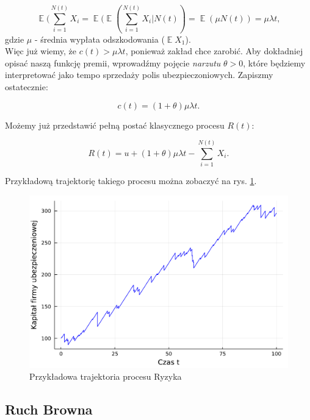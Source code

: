 \documentclass{article}
\theoremstyle{break}
\DeclareMathOperator{\EX}{\mathbb{E}}
\numberwithin{equation}{subsection}
\numberwithin{figure}{section}
\begin{document}
\begin{equation}
\EX(\sum_{i=1}^{N(t)}X_i = \EX(\EX(\sum_{i=1}^{N(t)}X_i | N(t)) = \EX(\mu N(t)) = \mu \lambda t,
\end{equation}
gdzie $\mu$ - średnia wypłata odszkodowania ($\EX X_1$).\\
Więc już wiemy, że $c(t) >  \mu \lambda t$, ponieważ zakład chce zarobić. Aby dokładniej opisać naszą funkcję premii, wprowadźmy pojęcie \emph{narzutu} $\theta >0$, które będziemy interpretować jako tempo sprzedaży polis ubezpieczoniowych. Zapiszmy ostatecznie:

\begin{equation}
c(t) = (1+\theta)\mu \lambda t. \label{eq:c}
\end{equation}

Możemy już przedstawić pełną postać klasycznego procesu $R(t)$:

\begin{equation}
R(t) = u +  (1+\theta)\mu \lambda t- \sum_{i=1}^{N(t)}X_i. \label{eq: class}
\end{equation}

Przykładową trajektorię takiego procesu można zobaczyć na rys. \ref{fig: 3}.
 
\begin{figure}
	\center
	\includegraphics[scale=0.35]{trajektoria_ryzyka.pdf}
	\caption{Przykładowa trajektoria procesu Ryzyka}
	\label{fig: 3}
\end{figure}

\subsection{Ruch Browna}
\end{document}
